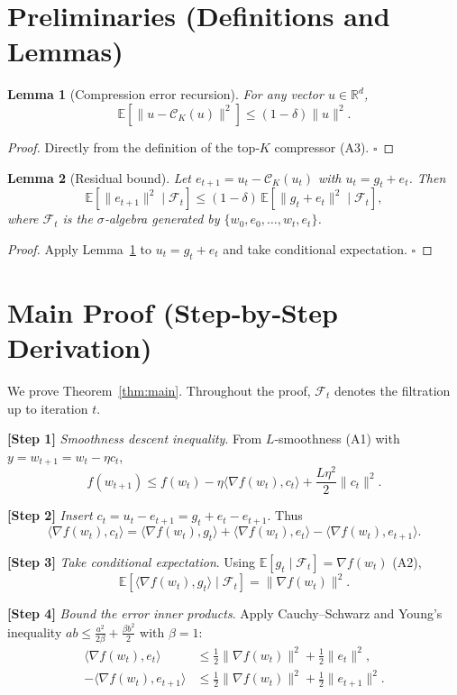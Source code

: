 \documentclass{article}
\newtheorem{lemma}{Lemma}
\newcommand{\E}{\mathbb{E}}
\newcommand{\R}{\mathbb{R}}
\newcommand{\inner}[2]{\langle #1,#2\rangle}
\begin{document}
\newpage
\section*{Preliminaries (Definitions and Lemmas)}
\begin{lemma}[Compression error recursion]\label{lem:compress}
For any vector $u\in\R^{d}$,
\[
\E\!\left[\|u-\mathcal C_{K}(u)\|^{2}\right]\le (1-\delta)\|u\|^{2}.
\]
\end{lemma}
\begin{proof}
Directly from the definition of the top‑$K$ compressor (A3). \hfill $\square$
\end{proof}

\begin{lemma}[Residual bound]\label{lem:residual}
Let $e_{t+1}=u_{t}-\mathcal C_{K}(u_{t})$ with $u_{t}=g_{t}+e_{t}$. Then
\[
\E\!\left[\|e_{t+1}\|^{2}\mid \mathcal F_{t}\right]\le (1-\delta)\,\E\!\left[\|g_{t}+e_{t}\|^{2}\mid \mathcal F_{t}\right],
\]
where $\mathcal F_{t}$ is the $\sigma$‑algebra generated by $\{w_{0},e_{0},\dots,w_{t},e_{t}\}$.
\end{lemma}
\begin{proof}
Apply Lemma~\ref{lem:compress} to $u_{t}=g_{t}+e_{t}$ and take conditional expectation. \hfill $\square$
\end{proof}

\section*{Main Proof (Step‑by‑Step Derivation)}
We prove Theorem~\ref{thm:main}. Throughout the proof, $\mathcal F_{t}$ denotes the filtration up to iteration $t$.

\noindent\textbf{[Step 1]} \emph{Smoothness descent inequality}.  
From $L$‑smoothness (A1) with $y=w_{t+1}=w_{t}-\eta c_{t}$,
\[
f(w_{t+1})\le f(w_{t})-\eta\inner{\nabla f(w_{t})}{c_{t}}+\frac{L\eta^{2}}{2}\|c_{t}\|^{2}.
\tag{5}
\]

\noindent\textbf{[Step 2]} \emph{Insert $c_{t}=u_{t}-e_{t+1}=g_{t}+e_{t}-e_{t+1}$}.  
Thus
\[
\inner{\nabla f(w_{t})}{c_{t}}
 =\inner{\nabla f(w_{t})}{g_{t}}+\inner{\nabla f(w_{t})}{e_{t}}-\inner{\nabla f(w_{t})}{e_{t+1}}.
\tag{6}
\]

\noindent\textbf{[Step 3]} \emph{Take conditional expectation}.  
Using $\E[g_{t}\mid\mathcal F_{t}]=\nabla f(w_{t})$ (A2),
\[
\E\!\left[\inner{\nabla f(w_{t})}{g_{t}}\mid\mathcal F_{t}\right]
 =\|\nabla f(w_{t})\|^{2}.
\tag{7}
\]

\noindent\textbf{[Step 4]} \emph{Bound the error inner products}.  
Apply Cauchy–Schwarz and Young’s inequality $ab\le\frac{a^{2}}{2\beta}+\frac{\beta b^{2}}{2}$ with $\beta=1$:
\[
\begin{aligned}
\inner{\nabla f(w_{t})}{e_{t}}
 &\le \frac{1}{2}\|\nabla f(w_{t})\|^{2}+\frac{1}{2}\|e_{t}\|^{2},\\
-\inner{\nabla f(w_{t})}{e_{t+1}}
 &\le \frac{1}{2}\|\nabla f(w_{t})\|^{2}+\frac{1}{2}\|e_{t+1}\|^{2}.
\end{aligned}
\tag{8}
\]
\end{document}
